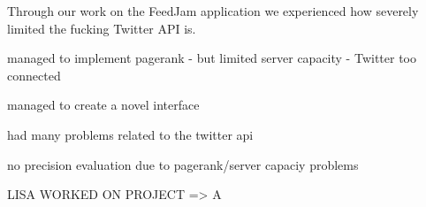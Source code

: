 Through our work on the FeedJam application we experienced how severely limited the fucking Twitter API is.

managed to implement pagerank
- but limited server capacity
- Twitter too connected

managed to create a novel interface

had many problems related to the twitter api

no precision evaluation due to pagerank/server capaciy problems

LISA WORKED ON PROJECT => A
